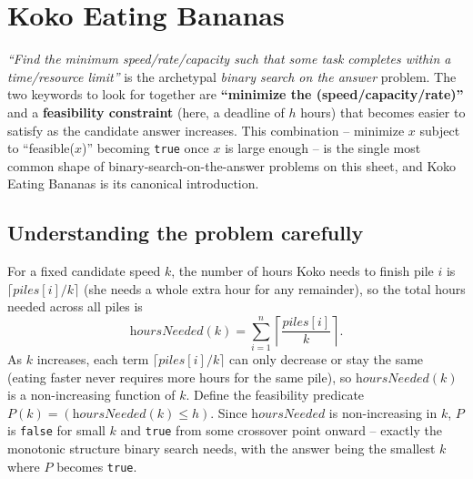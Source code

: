 \section{Koko Eating Bananas}
\label{sec:bs-koko}


\begin{patternbox}
\emph{``Find the minimum speed/rate/capacity such that some task completes
within a time/resource limit''} is the archetypal \emph{binary search on
the answer} problem. The two keywords to look for together are
\textbf{``minimize the (speed/capacity/rate)''} and a \textbf{feasibility
constraint} (here, a deadline of $h$ hours) that becomes easier to satisfy
as the candidate answer increases. This combination -- minimize $x$ subject
to ``feasible($x$)'' becoming \texttt{true} once $x$ is large enough -- is
the single most common shape of binary-search-on-the-answer problems on
this sheet, and Koko Eating Bananas is its canonical introduction.
\end{patternbox}

\subsection*{Understanding the problem carefully}

For a fixed candidate speed $k$, the number of hours Koko needs to finish
pile $i$ is $\lceil \textit{piles}[i] / k \rceil$ (she needs a whole extra
hour for any remainder), so the total hours needed across all piles is
\[
  \textit{hoursNeeded}(k) = \sum_{i=1}^{n} \left\lceil
  \frac{\textit{piles}[i]}{k} \right\rceil.
\]
As $k$ increases, each term $\lceil \textit{piles}[i]/k \rceil$ can only
decrease or stay the same (eating faster never requires more hours for the
same pile), so $\textit{hoursNeeded}(k)$ is a non-increasing function of
$k$. Define the feasibility predicate
$P(k) = (\textit{hoursNeeded}(k) \le h)$. Since $\textit{hoursNeeded}$ is
non-increasing in $k$, $P$ is \texttt{false} for small $k$ and
\texttt{true} from some crossover point onward -- exactly the monotonic
structure binary search needs, with the answer being the smallest $k$
where $P$ becomes \texttt{true}.

